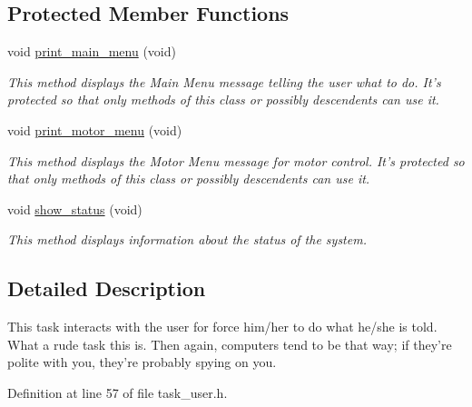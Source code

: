 \subsection*{Protected Member Functions}
\begin{DoxyCompactItemize}
\item 
\hypertarget{classtask__user_a36c99836d2ee036858d4a0ab61c2d5ec}{void \hyperlink{classtask__user_a36c99836d2ee036858d4a0ab61c2d5ec}{print\-\_\-main\-\_\-menu} (void)}\label{classtask__user_a36c99836d2ee036858d4a0ab61c2d5ec}

\begin{DoxyCompactList}\small\item\em This method displays the Main Menu message telling the user what to do. It's protected so that only methods of this class or possibly descendents can use it. \end{DoxyCompactList}\item 
\hypertarget{classtask__user_ae4c8890b06e117f57095951eee64c64f}{void \hyperlink{classtask__user_ae4c8890b06e117f57095951eee64c64f}{print\-\_\-motor\-\_\-menu} (void)}\label{classtask__user_ae4c8890b06e117f57095951eee64c64f}

\begin{DoxyCompactList}\small\item\em This method displays the Motor Menu message for motor control. It's protected so that only methods of this class or possibly descendents can use it. \end{DoxyCompactList}\item 
void \hyperlink{classtask__user_a105bebbd9cb1031154c3dfc3662db4a0}{show\-\_\-status} (void)
\begin{DoxyCompactList}\small\item\em This method displays information about the status of the system. \end{DoxyCompactList}\end{DoxyCompactItemize}


\subsection{Detailed Description}
This task interacts with the user for force him/her to do what he/she is told. What a rude task this is. Then again, computers tend to be that way; if they're polite with you, they're probably spying on you. 

Definition at line 57 of file task\-\_\-user.\-h.



